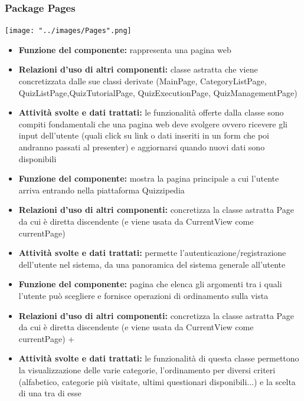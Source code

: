 \documentclass[a4paper,11pt]{article}
\begin{document}
			\subsubsection{Package Pages}
			\begin{center}
				\centerline{\texttt{[image: "../images/Pages".png]}}
			\end{center}
			\begin{itemize}
		    \item\textbf{Funzione del componente:} rappresenta una pagina web
			\item\textbf{Relazioni d'uso di altri componenti:} classe astratta che viene concretizzata dalle sue classi derivate (MainPage, CategoryListPage, QuizListPage,QuizTutorialPage, QuizExecutionPage, QuizManagementPage)
			\item\textbf{Attività svolte e dati trattati:} le funzionalità offerte dalla classe sono compiti fondamentali che una pagina web deve svolgere ovvero ricevere gli input dell'utente (quali click su link o dati inseriti in un form che poi andranno passati al presenter) e aggiornarsi quando nuovi dati sono disponibili
			\end{itemize}
			\begin{itemize}
		    \item\textbf{Funzione del componente:} mostra la pagina principale a cui l'utente arriva entrando nella piattaforma Quizzipedia 
			\item\textbf{Relazioni d'uso di altri componenti:} concretizza la classe astratta Page da cui è diretta discendente (e viene usata da CurrentView come currentPage)
			\item\textbf{Attività svolte e dati trattati:} permette l'autenticazione/registrazione dell'utente nel sistema, da una panoramica del sistema generale all'utente
			\end{itemize}
			\begin{itemize}
		    \item\textbf{Funzione del componente:} pagina che elenca gli argomenti tra i quali l'utente può scegliere e fornisce operazioni di ordinamento sulla vista 
			\item\textbf{Relazioni d'uso di altri componenti:} concretizza la classe astratta Page da cui è diretta discendente (e viene usata da CurrentView come currentPage)
 +			\item\textbf{Attività svolte e dati trattati:} le funzionalità di questa classe permettono la visualizzazione delle varie categorie, l'ordinamento per diversi criteri (alfabetico, categorie più visitate, ultimi questionari disponibili...) e la scelta di una tra di esse
			\end{itemize}
\end{document}
